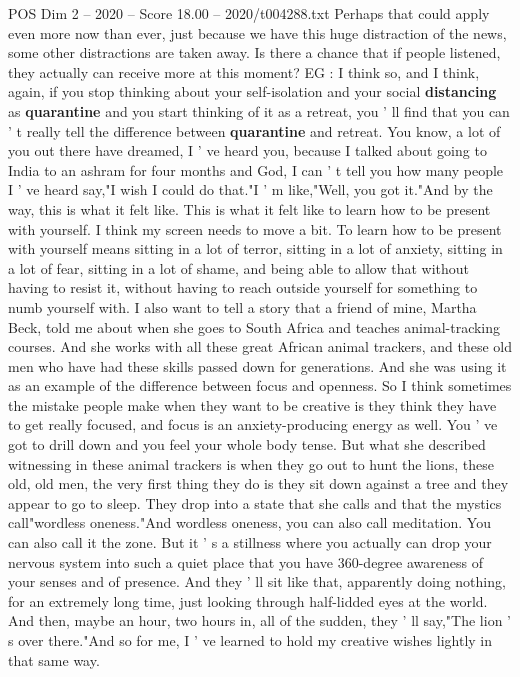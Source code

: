 \begin{textsample}{POS Dim 2 – 2020 – Score 18.00 – 2020/t004288.txt}
Perhaps that could apply even more now than ever, just because we have this huge distraction of the news, some other distractions are taken away.
Is there a chance that if people listened, they actually can receive more at this moment?
EG : I think so, and I think, again, if you stop thinking about your self-isolation and your social \textbf{distancing} as \textbf{quarantine} and you start thinking of it as a retreat, you ' ll find that you can ' t really tell the difference between \textbf{quarantine} and retreat.
You know, a lot of you out there have dreamed, I ' ve heard you, because I talked about going to India to an ashram for four months and God, I can ' t tell you how many people I ' ve heard say,"I wish I could do that."I ' m like,"Well, you got it."And by the way, this is what it felt like.
This is what it felt like to learn how to be present with yourself.
I think my screen needs to move a bit.
To learn how to be present with yourself means sitting in a lot of terror, sitting in a lot of anxiety, sitting in a lot of fear, sitting in a lot of shame, and being able to allow that without having to resist it, without having to reach outside yourself for something to numb yourself with.
I also want to tell a story that a friend of mine, Martha Beck, told me about when she goes to South Africa and teaches animal-tracking courses.
And she works with all these great African animal trackers, and these old men who have had these skills passed down for generations.
And she was using it as an example of the difference between focus and openness.
So I think sometimes the mistake people make when they want to be creative is they think they have to get really focused, and focus is an anxiety-producing energy as well.
You ' ve got to drill down and you feel your whole body tense.
But what she described witnessing in these animal trackers is when they go out to hunt the lions, these old, old men, the very first thing they do is they sit down against a tree and they appear to go to sleep.
They drop into a state that she calls and that the mystics call"wordless oneness."And wordless oneness, you can also call meditation.
You can also call it the zone.
But it ' s a stillness where you actually can drop your nervous system into such a quiet place that you have 360-degree awareness of your senses and of presence.
And they ' ll sit like that, apparently doing nothing, for an extremely long time, just looking through half-lidded eyes at the world.
And then, maybe an hour, two hours in, all of the sudden, they ' ll say,"The lion ' s over there."And so for me, I ' ve learned to hold my creative wishes lightly in that same way.

\end{textsample}
